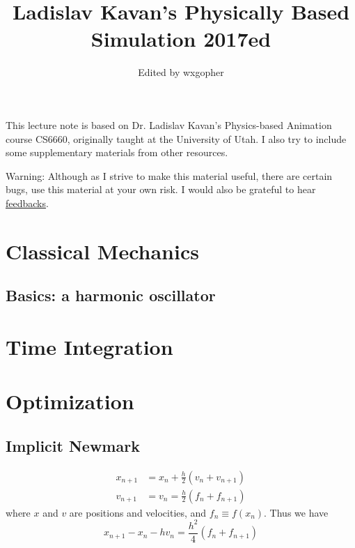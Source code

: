 \documentclass{fancydoc}
\begin{document}
\title{Ladislav Kavan's Physically Based Simulation 2017ed}
\author{Edited by wxgopher}

\maketitle
\tableofcontents
\newpage
{\large This lecture note is based on Dr. Ladislav Kavan's Physics-based Animation course CS6660, originally taught at the University of Utah. I also try to include some supplementary materials from other resources.}


{\large Warning: Although as I strive to make this material useful, there are certain bugs, use this material at your own risk. I would also be grateful to hear \href{mailto:wxguojlu@gmail.com}{feedbacks}.}

\dotfill

\section{Classical Mechanics}

\subsection{Basics: a harmonic oscillator}

\section{Time Integration}

\section{Optimization}
\subsection{Implicit Newmark}

\begin{subequations}
	\begin{align}
	x_{n+1} &= x_n + \frac{h}{2}(v_n + v_{n+1})\\
	v_{n+1} &= v_n = \frac{h}{2}(f_n + f_{n+1})
	\end{align}
\end{subequations}
where $x$ and $v$ are positions and velocities, and $f_n \equiv f(x_n)$. Thus we have
\begin{equation}\label{secoptim:nw_eq}
x_{n+1} - x_n - hv_n = \frac{h^2}{4}(f_n + f_{n+1})
\end{equation}
\end{document}
